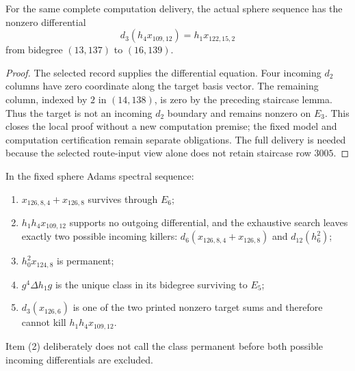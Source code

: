 \begin{lemma}
  \label{lem:near126-h4-x109-nonzero-d3}
  \notready
  For the same complete computation delivery, the actual sphere sequence has
  the nonzero differential
  \[
    d_3(h_4x_{109,12})=h_1x_{122,15,2}
  \]
  from bidegree $(13,137)$ to $(16,139)$.
\end{lemma}
\begin{proof}
  The selected record supplies the differential equation. Four incoming
  $d_2$ columns have zero coordinate along the target basis vector. The
  remaining column, indexed by $2$ in $(14,138)$, is zero by the preceding
  staircase lemma. Thus the target is not an incoming $d_2$ boundary and
  remains nonzero on $E_3$. This closes the local proof without a new
  computation premise; the fixed model and computation certification remain
  separate obligations. The full delivery is needed because the selected
  route-input view alone does not retain staircase row $3005$.
\end{proof}

\begin{proposition}
  \label{evidence:near126-core}
  \notready
  In the fixed sphere Adams spectral sequence:
  \begin{enumerate}
    \item $x_{126,8,4}+x_{126,8}$ survives through $E_6$;
    \item $h_1h_4x_{109,12}$ supports no outgoing differential, and the
      exhaustive search leaves exactly two possible incoming killers:
      $d_6(x_{126,8,4}+x_{126,8})$ and $d_{12}(h_6^2)$;
    \item $h_0^2x_{124,8}$ is permanent;
    \item $g^4\Delta h_1g$ is the unique class in its bidegree surviving to
      $E_5$;
    \item $d_3(x_{126,6})$ is one of the two printed nonzero target sums and
      therefore cannot kill $h_1h_4x_{109,12}$.
  \end{enumerate}
  Item (2) deliberately does not call the class permanent before both possible
  incoming differentials are excluded.
\end{proposition}

